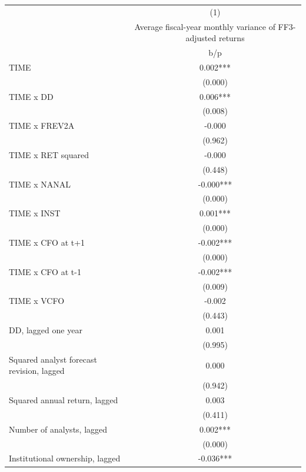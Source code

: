 {
\def\sym#1{\ifmmode^{#1}\else\(^{#1}\)\fi}
\begin{tabular}{l*{1}{c}}
\hline\hline
                    &\multicolumn{1}{c}{(1)}\\
                    &\multicolumn{1}{c}{Average fiscal-year monthly variance of FF3-adjusted returns}\\
                    &         b/p   \\
\hline
TIME                &       0.002***\\
                    &     (0.000)   \\
TIME x DD           &       0.006***\\
                    &     (0.008)   \\
TIME x FREV2A       &      -0.000   \\
                    &     (0.962)   \\
TIME x RET squared  &      -0.000   \\
                    &     (0.448)   \\
TIME x NANAL        &      -0.000***\\
                    &     (0.000)   \\
TIME x INST         &       0.001***\\
                    &     (0.000)   \\
TIME x CFO at t+1   &      -0.002***\\
                    &     (0.000)   \\
TIME x CFO at t-1   &      -0.002***\\
                    &     (0.009)   \\
TIME x VCFO         &      -0.002   \\
                    &     (0.443)   \\
DD, lagged one year &       0.001   \\
                    &     (0.995)   \\
Squared analyst forecast revision, lagged&       0.000   \\
                    &     (0.942)   \\
Squared annual return, lagged&       0.003   \\
                    &     (0.411)   \\
Number of analysts, lagged&       0.002***\\
                    &     (0.000)   \\
Institutional ownership, lagged&      -0.036***\\

\end{tabular}}
